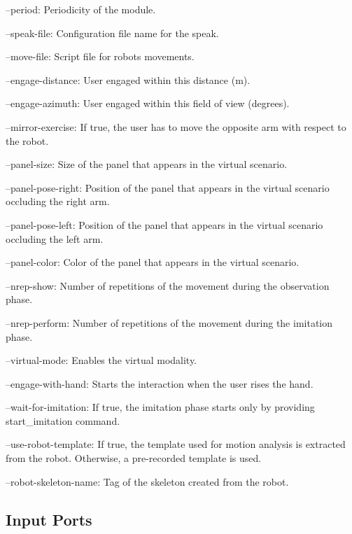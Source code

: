 \begin{DoxyItemize}
\item --period\+: Periodicity of the module.
\item --speak-\/file\+: Configuration file name for the speak.
\item --move-\/file\+: Script file for robot\textquotesingle{}s movements.
\item --engage-\/distance\+: User engaged within this distance (m).
\item --engage-\/azimuth\+: User engaged within this field of view (degrees).
\item --mirror-\/exercise\+: If true, the user has to move the opposite arm with respect to the robot.
\item --panel-\/size\+: Size of the panel that appears in the virtual scenario.
\item --panel-\/pose-\/right\+: Position of the panel that appears in the virtual scenario occluding the right arm.
\item --panel-\/pose-\/left\+: Position of the panel that appears in the virtual scenario occluding the left arm.
\item --panel-\/color\+: Color of the panel that appears in the virtual scenario.
\item --nrep-\/show\+: Number of repetitions of the movement during the observation phase.
\item --nrep-\/perform\+: Number of repetitions of the movement during the imitation phase.
\item --virtual-\/mode\+: Enables the virtual modality.
\item --engage-\/with-\/hand\+: Starts the interaction when the user rises the hand.
\item --wait-\/for-\/imitation\+: If true, the imitation phase starts only by providing start\+\_\+imitation command.
\item --use-\/robot-\/template\+: If true, the template used for motion analysis is extracted from the robot. Otherwise, a pre-\/recorded template is used.
\item --robot-\/skeleton-\/name\+: Tag of the skeleton created from the robot. 
\end{DoxyItemize}\hypertarget{group__skeletonViewer_inputports_sec}{}\subsection{Input Ports}\label{group__skeletonViewer_inputports_sec}

